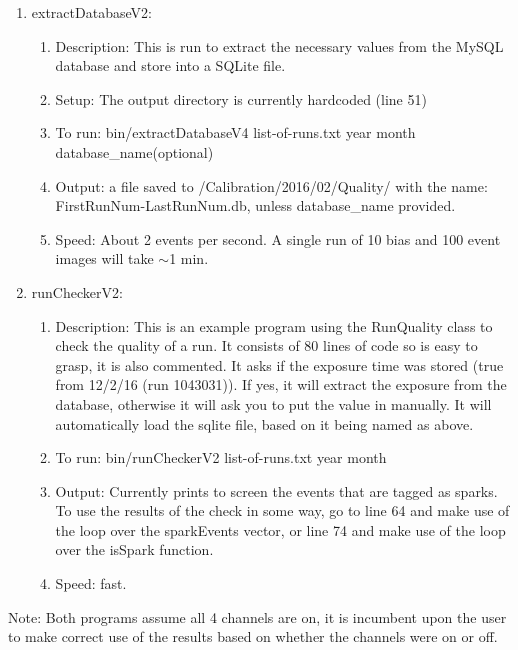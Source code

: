 \documentclass[12pt]{article}
\begin{document}
\begin{enumerate}
\item extractDatabaseV2: 
	\begin{enumerate}
		\item Description: This is run to extract the necessary values from the MySQL database and store into a SQLite file. 
		\item Setup: The output directory is currently hardcoded (line 51)
		\item To run: bin/extractDatabaseV4 list-of-runs.txt year month database_name(optional)
		\item Output: a file saved to /Calibration/2016/02/Quality/  with the name: FirstRunNum-LastRunNum.db, unless database_name provided.
		\item Speed: About 2 events per second. A single run of 10 bias and 100 event images will take $\sim$1 min.
	\end{enumerate}
\item runCheckerV2:

 	\begin{enumerate}
 		\item Description: This is an example program using the RunQuality class to check the quality of a run. It consists of 80 lines of code so is easy to grasp, it is also commented. It asks if the exposure time was stored (true from 12/2/16 (run 1043031)). If yes, it will extract the exposure from the database, otherwise it will ask you to put the value in manually. It will automatically load the sqlite file, based on it being named as above. 
 		\item To run: bin/runCheckerV2 list-of-runs.txt year month
		\item Output: Currently prints to screen the events that are tagged as sparks. To use the results of the check in some way, go to line 64 and make use of the loop over the sparkEvents vector, or line 74 and make use of the loop over the isSpark function. 
		\item Speed: fast.
	\end{enumerate}
\end{enumerate}

\noindent Note: Both programs assume all 4 channels are on, it is incumbent upon the user to make correct use of the results based on whether the channels were on or off.
\end{document}
